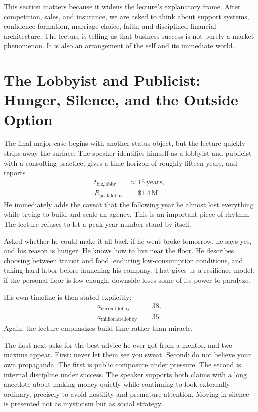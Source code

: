 This section matters because it widens the lecture's explanatory frame. After competition, sales, and insurance, we are asked to think about support systems, confidence formation, marriage choice, faith, and disciplined financial architecture. The lecture is telling us that business success is not purely a market phenomenon. It is also an arrangement of the self and its immediate world.

\section{The Lobbyist and Publicist: Hunger, Silence, and the Outside Option}

The final major case begins with another status object, but the lecture quickly strips away the surface. The speaker identifies himself as a lobbyist and publicist with a consulting practice, gives a time horizon of roughly fifteen years, and reports
\begin{align}
t_{\text{biz,lobby}} &\approx 15\ \text{years},\\
R_{\text{peak,lobby}} &= \text{\$}1.4\,\mathrm{M}.
\end{align}
He immediately adds the caveat that the following year he almost lost everything while trying to build and scale an agency. This is an important piece of rhythm. The lecture refuses to let a peak-year number stand by itself.

Asked whether he could make it all back if he went broke tomorrow, he says yes, and his reason is hunger. He knows how to live near the floor. He describes choosing between transit and food, enduring low-consumption conditions, and taking hard labor before launching his company. That gives us a resilience model: if the personal floor is low enough, downside loses some of its power to paralyze.

His own timeline is then stated explicitly:
\begin{align}
a_{\text{current,lobby}} &= 38,\\
a_{\text{millionaire,lobby}} &= 35.
\end{align}
Again, the lecture emphasizes build time rather than miracle.

The host next asks for the best advice he ever got from a mentor, and two maxims appear. First: never let them see you sweat. Second: do not believe your own propaganda. The first is public composure under pressure. The second is internal discipline under success. The speaker supports both claims with a long anecdote about making money quietly while continuing to look externally ordinary, precisely to avoid hostility and premature attention. Moving in silence is presented not as mysticism but as social strategy.

